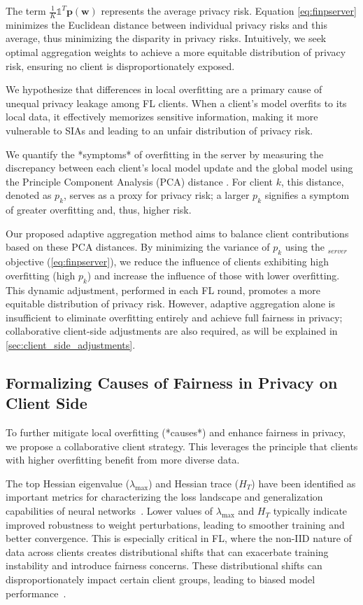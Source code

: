 The term $\frac{1}{K} \mathds{1}^T \mathbf{p}(\mathbf{w})$ represents the average privacy risk. Equation \eqref{eq:finpserver} minimizes the Euclidean distance between individual privacy risks and this average, thus minimizing the disparity in privacy risks. Intuitively, we seek optimal aggregation weights to achieve a more equitable distribution of privacy risk, ensuring no client is disproportionately exposed.


We hypothesize that differences in local overfitting are a primary cause of unequal privacy leakage among FL clients. When a client's model overfits to its local data, it effectively memorizes sensitive information, making it more vulnerable to SIAs and leading to an unfair distribution of privacy risk.

We quantify the *symptoms* of overfitting in the server by measuring the discrepancy between each client's local model update and the global model using the Principle Component Analysis (PCA) distance \cite{durmus2021federated}. For client $k$, this distance, denoted as $p_k$, serves as a proxy for privacy risk; a larger $p_k$ signifies a symptom of greater overfitting and, thus, higher risk.

Our proposed adaptive aggregation method aims to balance client contributions based on these PCA distances. By minimizing the variance of $p_k$ using the \sysname$_{server}$ objective (\autoref{eq:finpserver}), we reduce the influence of clients exhibiting high overfitting (high $p_k$) and increase the influence of those with lower overfitting. This dynamic adjustment, performed in each FL round, promotes a more equitable distribution of privacy risk. However, adaptive aggregation alone is insufficient to eliminate overfitting entirely and achieve full fairness in privacy; collaborative client-side adjustments are also required, as will be explained in \autoref{sec:client_side_adjustments}.




\subsection{Formalizing Causes of Fairness in Privacy on Client Side}\label{sec:client_side_adjustments}

To further mitigate local overfitting (*causes*) and enhance fairness in privacy, we propose a collaborative client strategy. This leverages the principle that clients with higher overfitting benefit from more diverse data.

The top Hessian eigenvalue ($\lambda_{\text{max}}$) and Hessian trace ($H_{T}$) have been identified as important metrics for characterizing the loss landscape and generalization capabilities of neural networks~\cite{Jiang2020Fantastic}. Lower values of $\lambda_{\text{max}}$ and $H_{T}$ typically indicate improved robustness to weight perturbations, leading to smoother training and better convergence. This is especially critical in FL, where the non-IID nature of data across clients creates distributional shifts that can exacerbate training instability and introduce fairness concerns. These distributional shifts can disproportionately impact certain client groups, leading to biased model performance~\cite{mendieta2022local}. 


